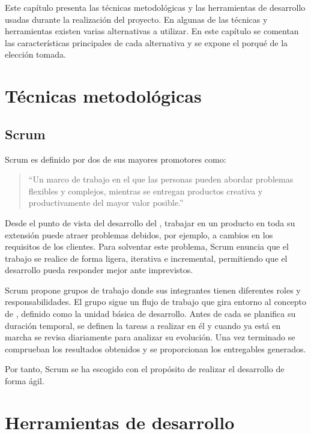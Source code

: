 Este capítulo presenta las técnicas metodológicas y las herramientas de
desarrollo usadas durante la realización del proyecto. En algunas de las
técnicas y herramientas existen varias alternativas a utilizar. En este capítulo
se comentan las características principales de cada alternativa y se expone el
porqué de la elección tomada.


\section{Técnicas metodológicas}{\label{sec:tecnicas}}

\subsection{Scrum}{\label{sec:scrum}}
Scrum es definido por dos de sus mayores promotores \textcite{schwaber2017}
como:
\begin{quotation}``Un marco de trabajo en el que las personas pueden
  abordar problemas flexibles y complejos, mientras se entregan productos creativa y
  productivamente del mayor valor posible.''
\end{quotation}

Desde el punto de vista del desarrollo del , trabajar en
un producto en toda su extensión puede atraer problemas debidos, por ejemplo, a
cambios en los requisitos de los clientes. Para solventar este problema, Scrum
enuncia que el trabajo se realice de forma ligera, iterativa e incremental,
permitiendo que el desarrollo pueda responder mejor ante imprevistos.

Scrum propone grupos de trabajo donde sus integrantes tienen diferentes roles y
responsabilidades. El grupo sigue un flujo de trabajo que gira entorno al
concepto de , definido como la unidad básica de
desarrollo. Antes de cada  se planifica su duración
temporal, se definen la tareas a realizar en él y cuando ya está en marcha se
revisa diariamente para analizar su evolución. Una vez terminado se comprueban
los resultados obtenidos y se proporcionan los entregables generados.

Por tanto, Scrum se ha escogido con el propósito de realizar el desarrollo de
forma ágil.


\section{Herramientas  de desarrollo}
  {\label{sec:herramientas}}

